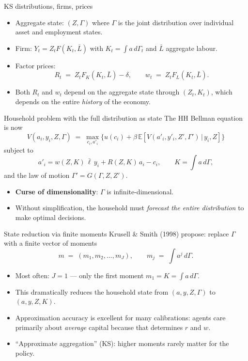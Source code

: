 \begin{frame}{KS distributions, firms, prices}
\begin{itemize}
\item Aggregate state: $(Z, \Gamma)$ where $\Gamma$ is the joint distribution over individual asset and employment states.
\medskip
\item Firm: $Y_t = Z_t F(K_t, \bar L)$ with $K_t = \int a\,d\Gamma_t$ and $\bar L$ aggregate labour.
\medskip
\item Factor prices:
\[
R_t \;=\; Z_t F_K(K_t, \bar L) - \delta, \qquad
w_t \;=\; Z_t F_L(K_t, \bar L).
\]
\medskip
\item Both $R_t$ and $w_t$ depend on the aggregate state through $(Z_t, K_t)$, which depends on the entire \emph{history} of the economy.
\end{itemize}
\end{frame}

\begin{frame}{Household problem with the full distribution as state}
The HH Bellman equation is now
\[
V(a_i, y_i, Z, \Gamma) \;=\; \max_{c_i, a'_i}
\big\{u(c_i) + \beta\,\mathbb{E}\!\left[V(a'_i, y'_i, Z', \Gamma')\,\big|\,y_i, Z\right]\big\}
\]
subject to
\[
a'_{i} = w(Z,K)\,\bar\ell\, y_i + R(Z,K)\,a_i - c_i, \qquad K = \int a\,d\Gamma,
\]
and the law of motion $\Gamma' = G(\Gamma, Z, Z')$.
\medskip
\begin{itemize}
\item \textbf{Curse of dimensionality}: $\Gamma$ is infinite-dimensional.
\item Without simplification, the household must \emph{forecast the entire distribution} to make optimal decisions.
\end{itemize}
\end{frame}

\begin{frame}{State reduction via finite moments}
Krusell \& Smith (1998) propose: replace $\Gamma$ with a finite vector of moments
\[
m \;=\; (m_1, m_2, \ldots, m_J), \qquad m_j \;=\; \int a^j\, d\Gamma.
\]
\medskip
\begin{itemize}
\item Most often: $J = 1$ --- only the first moment $m_1 = K = \int a\,d\Gamma$.
\medskip
\item This dramatically reduces the household state from $(a,y,Z,\Gamma)$ to $(a,y,Z,K)$.
\medskip
\item Approximation accuracy is excellent for many calibrations: agents care primarily about \emph{average} capital because that determines $r$ and $w$.
\medskip
\item ``Approximate aggregation'' (KS): higher moments rarely matter for the policy.
\end{itemize}
\end{frame}

